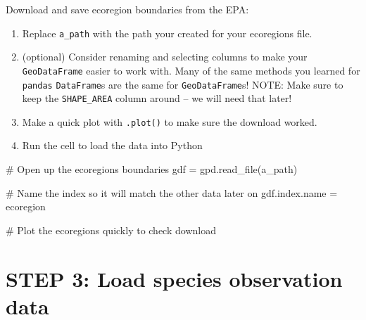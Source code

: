 \documentclass[
  letterpaper,
  DIV=11,
  numbers=noendperiod,
  oneside]{scrreprt}
\newenvironment{Shaded}{\begin{snugshade}}{\end{snugshade}}
\newcommand{\CommentTok}[1]{\textcolor[rgb]{0.37,0.37,0.37}{#1}}
\newcommand{\NormalTok}[1]{\textcolor[rgb]{0.00,0.23,0.31}{#1}}
\newcommand{\OperatorTok}[1]{\textcolor[rgb]{0.37,0.37,0.37}{#1}}
\newcommand{\StringTok}[1]{\textcolor[rgb]{0.13,0.47,0.30}{#1}}
\providecommand{\tightlist}{%
  \setlength{\itemsep}{0pt}\setlength{\parskip}{0pt}}
\begin{document}
\begin{tcolorbox}[enhanced jigsaw, colbacktitle=quarto-callout-color!10!white, opacityback=0, bottomtitle=1mm, toptitle=1mm, bottomrule=.15mm, left=2mm, colframe=quarto-callout-color-frame, leftrule=.75mm, opacitybacktitle=0.6, colback=white, rightrule=.15mm, toprule=.15mm, breakable, titlerule=0mm, title=\textcolor{quarto-callout-color}{\faInfo}\hspace{0.5em}{Try It: Load ecoregions into Python}, coltitle=black, arc=.35mm]

Download and save ecoregion boundaries from the EPA:

\begin{enumerate}
\def\labelenumi{\arabic{enumi}.}
\tightlist
\item
  Replace \texttt{a\_path} with the path your created for your
  ecoregions file.
\item
  (optional) Consider renaming and selecting columns to make your
  \texttt{GeoDataFrame} easier to work with. Many of the same methods
  you learned for \texttt{pandas} \texttt{DataFrame}s are the same for
  \texttt{GeoDataFrame}s! NOTE: Make sure to keep the
  \texttt{\textquotesingle{}SHAPE\_AREA\textquotesingle{}} column around
  -- we will need that later!
\item
  Make a quick plot with \texttt{.plot()} to make sure the download
  worked.
\item
  Run the cell to load the data into Python
\end{enumerate}

\end{tcolorbox}

\begin{Shaded}
\begin{Highlighting}[]
\CommentTok{\# Open up the ecoregions boundaries}
\NormalTok{gdf }\OperatorTok{=}\NormalTok{ gpd.read\_file(a\_path)}

\CommentTok{\# Name the index so it will match the other data later on}
\NormalTok{gdf.index.name }\OperatorTok{=} \StringTok{\textquotesingle{}ecoregion\textquotesingle{}}

\CommentTok{\# Plot the ecoregions quickly to check download}
\end{Highlighting}
\end{Shaded}

\section{STEP 3: Load species observation
data}\label{step-3-load-species-observation-data}
\end{document}
